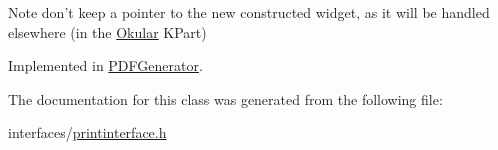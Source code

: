 \begin{DoxyNote}{Note}
don't keep a pointer to the new constructed widget, as it will be handled elsewhere (in the \hyperlink{namespaceOkular}{Okular} K\+Part) 
\end{DoxyNote}


Implemented in \hyperlink{classPDFGenerator_afc09c9448b0942c506ca058ab01e6b36}{P\+D\+F\+Generator}.



The documentation for this class was generated from the following file\+:\begin{DoxyCompactItemize}
\item 
interfaces/\hyperlink{printinterface_8h}{printinterface.\+h}\end{DoxyCompactItemize}
